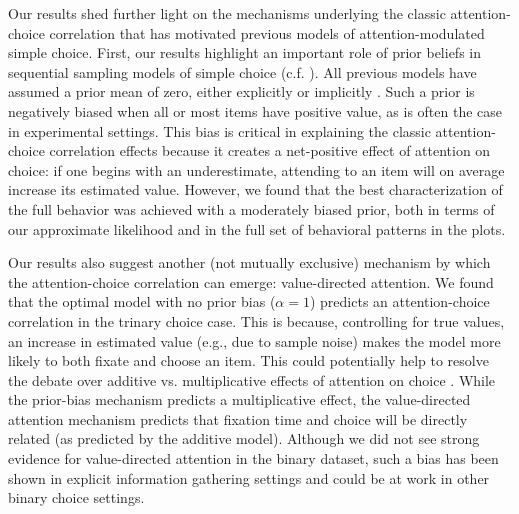 Our results shed further light on the mechanisms underlying the classic attention-choice correlation that has motivated previous models of attention-modulated simple choice. First, our results highlight an important role of prior beliefs in sequential sampling models of simple choice (c.f.  \citealp{jang2021optimal}). All previous models have assumed a prior mean of zero, either explicitly \citep{song2019proactive,jang2021optimal} or implicitly \citep{krajbich2010visual,krajbich2011multialternative,gluth2020valuebased}. Such a prior is negatively biased when all or most items have positive value, as is often the case in experimental settings. This bias is critical in explaining the classic attention-choice correlation effects because it creates a net-positive effect of attention on choice: if one begins with an underestimate, attending to an item will on average increase its estimated value. However, we found that the best characterization of the full behavior was achieved with a moderately biased prior, both in terms of our approximate likelihood and in the full set of behavioral patterns in the plots.

Our results also suggest another (not mutually exclusive) mechanism by which the attention-choice correlation can emerge: value-directed attention. We found that the optimal model with no prior bias ($\alpha=1$) predicts an attention-choice correlation in the trinary choice case. This is because, controlling for true values, an increase in estimated value (e.g., due to sample noise) makes the model more likely to both fixate and choose an item. This could potentially help to resolve the debate over additive vs. multiplicative effects of attention on choice \citep{cavanagh2014eye,smith2019gaze}. While the prior-bias mechanism predicts a multiplicative effect, the value-directed attention mechanism predicts that fixation time and choice will be directly related (as predicted by the additive model). Although we did not see strong evidence for value-directed attention in the binary dataset, such a bias has been shown in explicit information gathering settings \citep{hunt2016approachinduced} and could be at work in other binary choice settings.

